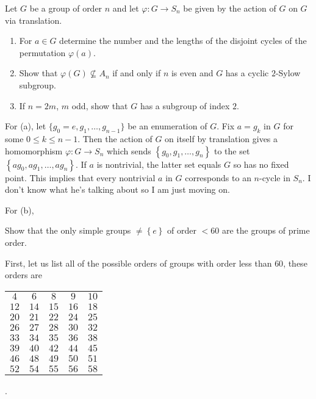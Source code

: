 \begin{problem}
  Let \(G\) be a group of order \(n\) and let \(\varphi\colon G\to S_n\) be
  given by the action of \(G\) on \(G\) via translation.
  \begin{enumerate}[label=(\alph*),noitemsep]
  \item For \(a\in G\) determine the number and the lengths of the disjoint
    cycles of the permutation \(\varphi(a)\).
  \item Show that \(\varphi(G)\nsubseteq A_n\) if and only if \(n\) is even
    and \(G\) has a cyclic \(2\)-Sylow subgroup.
  \item If \(n=2m\), \(m\) odd, show that \(G\) has a subgroup of index
    \(2\).
  \end{enumerate}
\end{problem}
\begin{solution}
  For (a), let \(\{g_0=e,g_1,\dotsc,g_{n-1}\}\) be an enumeration of
  \(G\). Fix \(a=g_k\) in \(G\) for some \(0\leq k\leq n-1\). Then the
  action of \(G\) on itself by translation gives a homomorphism
  \(\varphi\colon G\to S_n\) which sends
  \(\left\{g_0,g_1,\dotsc,g_n\right\}\) to the set
  \(\left\{ag_0,ag_1,\dotsc,ag_n\right\}\). If \(a\) is nontrivial, the
  latter set equals \(G\) so has no fixed point. This implies that every
  nontrivial \(a\) in \(G\) corresponds to an \(n\)-cycle in \(S_n\). I
  don't know what he's talking about so I am just moving on.

  For (b),
\end{solution}

\begin{problem}
  Show that the only simple groups \(\neq\left\{e\right\}\) of order
  \(<60\) are the groups of prime order.
\end{problem}
\begin{solution}
  First, let us list all of the possible orders of groups with order less
  than \(60\), these orders are
  \begin{center}
    \begin{tabular}{ccccc}
      \(4\)&\(6\)&\(8\)&\(9\)&\(10\)\\
      \(12\)&\(14\)&\(15\)&\(16\)&\(18\)\\
      \(20\)&\(21\)&\(22\)&\(24\)&\(25\)\\
      \(26\)&\(27\)&\(28\)&\(30\)&\(32\)\\
      \(33\)&\(34\)&\(35\)&\(36\)&\(38\)\\
      \(39\)&\(40\)&\(42\)&\(44\)&\(45\)\\
      \(46\)&\(48\)&\(49\)&\(50\)&\(51\)\\
      \(52\)&\(54\)&\(55\)&\(56\)&\(58\)
    \end{tabular}.
  \end{center}
\end{solution}

